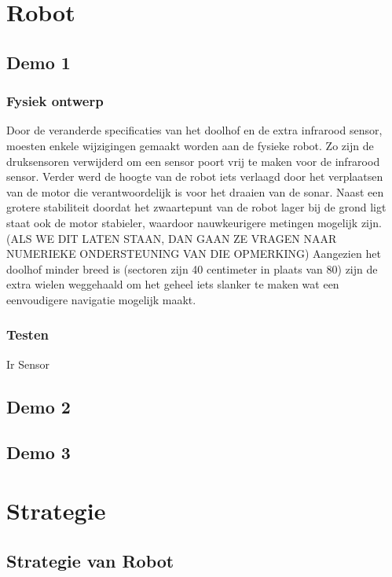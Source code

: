 \documentclass[12pt,a4paper]{report}
\begin{document}
\chapter{Robot}

\section{Demo 1}

\subsection{Fysiek ontwerp}

Door de veranderde specificaties van het doolhof en de extra infrarood sensor, moesten enkele wijzigingen gemaakt worden aan de fysieke robot. Zo zijn de druksensoren verwijderd om een sensor poort vrij te maken voor de infrarood sensor. Verder werd de hoogte van de robot iets verlaagd door het verplaatsen van de motor die verantwoordelijk is voor het draaien van de sonar. Naast een grotere stabiliteit doordat het zwaartepunt van de robot lager bij de grond ligt staat ook de motor stabieler, waardoor nauwkeurigere metingen mogelijk zijn. (ALS WE DIT LATEN STAAN, DAN GAAN ZE VRAGEN NAAR NUMERIEKE ONDERSTEUNING VAN DIE OPMERKING) Aangezien het doolhof minder breed is (sectoren zijn 40 centimeter in plaats van 80) zijn de extra wielen weggehaald om het geheel iets slanker te maken wat een eenvoudigere navigatie mogelijk maakt.

\subsection{Testen}

Ir Sensor

\section{Demo 2}

\section{Demo 3}

\chapter{Strategie}

\section{Strategie van Robot}
\end{document}
